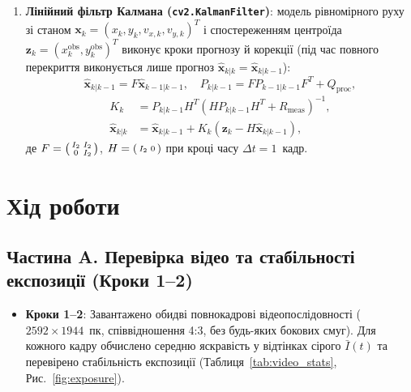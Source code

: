 \documentclass[14pt, a4paper]{extarticle}
\begin{document}
\begin{enumerate}
    \item \textbf{Лінійний фільтр Калмана (\texttt{cv2.KalmanFilter})}: модель рівномірного руху зі станом $\mathbf{x}_k = (x_k, y_k, v_{x,k}, v_{y,k})^T$ і спостереженням центроїда $\mathbf{z}_k = (x_k^{\text{obs}}, y_k^{\text{obs}})^T$ виконує кроки прогнозу й корекції (під час повного перекриття виконується лише прогноз $\hat{\mathbf{x}}_{k|k} = \hat{\mathbf{x}}_{k|k-1}$):
    \begin{equation}\label{eq:kalman_pred}
        \hat{\mathbf{x}}_{k|k-1} = F \hat{\mathbf{x}}_{k-1|k-1}, \quad P_{k|k-1} = F P_{k-1|k-1} F^T + Q_{\text{proc}},
    \end{equation}
    \begin{equation}\label{eq:kalman_upd}
    \begin{split}
        K_k &= P_{k|k-1} H^T (H P_{k|k-1} H^T + R_{\text{meas}})^{-1}, \\
        \hat{\mathbf{x}}_{k|k} &= \hat{\mathbf{x}}_{k|k-1} + K_k (\mathbf{z}_k - H \hat{\mathbf{x}}_{k|k-1}),
    \end{split}
    \end{equation}
    де $F = \begin{psmallmatrix} I_2 & I_2 \\ 0 & I_2 \end{psmallmatrix}$, $H = \begin{psmallmatrix} I_2 & 0 \end{psmallmatrix}$ при кроці часу $\Delta t = 1$~кадр.
\end{enumerate}

\section{Хід роботи}

\subsection{Частина A. Перевірка відео та стабільності експозиції (Кроки 1--2)}
\begin{itemize}
    \item \textbf{Кроки 1--2}: Завантажено обидві повнокадрові відеопослідовності ($2592 \times 1944$~пк, співвідношення 4:3, без будь-яких бокових смуг). Для кожного кадру обчислено середню яскравість у відтінках сірого $\bar{I}(t)$ та перевірено стабільність експозиції (Таблиця~\ref{tab:video_stats}, Рис.~\ref{fig:exposure}).
\end{itemize}
\end{document}
